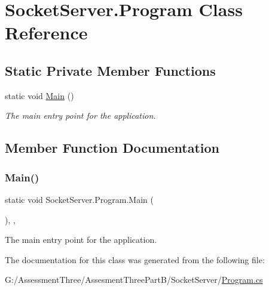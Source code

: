 \hypertarget{class_socket_server_1_1_program}{}\section{Socket\+Server.\+Program Class Reference}
\label{class_socket_server_1_1_program}
\subsection*{Static Private Member Functions}
\begin{DoxyCompactItemize}
\item 
static void \hyperlink{class_socket_server_1_1_program_aa4e55dd6631d9e57cff1547e14ca7853}{Main} ()
\begin{DoxyCompactList}\small\item\em The main entry point for the application. \end{DoxyCompactList}\end{DoxyCompactItemize}


\subsection{Member Function Documentation}
\mbox{\label{class_socket_server_1_1_program_aa4e55dd6631d9e57cff1547e14ca7853}} 
\subsubsection{\texorpdfstring{Main()}{Main()}}
{\footnotesize\ttfamily static void Socket\+Server.\+Program.\+Main (\begin{DoxyParamCaption}{ }\end{DoxyParamCaption})\hspace{0.3cm}{\ttfamily [inline]}, {\ttfamily [static]}, {\ttfamily [private]}}



The main entry point for the application. 



The documentation for this class was generated from the following file\+:\begin{DoxyCompactItemize}
\item 
G\+:/\+Assessment\+Three/\+Assesment\+Three\+Part\+B/\+Socket\+Server/\hyperlink{_socket_server_2_program_8cs}{Program.\+cs}\end{DoxyCompactItemize}
